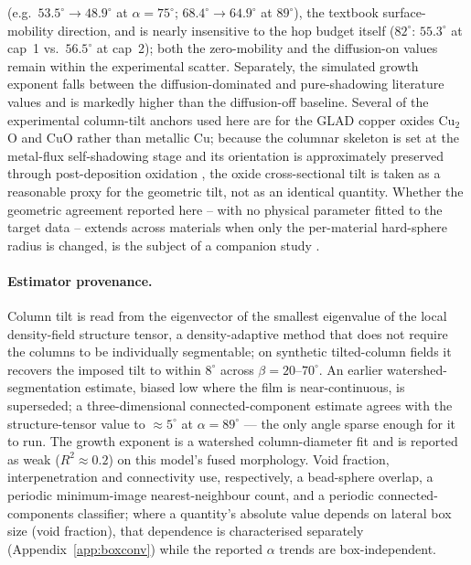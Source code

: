 \documentclass[aip,amsmath,amssymb,reprint]{revtex4-1}
\newcommand{\dang}{\ensuremath{\alpha}}
\begin{document}
(e.g.\ $53.5^{\circ}\!\to\!48.9^{\circ}$ at $\dang=75^{\circ}$;
$68.4^{\circ}\!\to\!64.9^{\circ}$ at $89^{\circ}$), the textbook
surface-mobility direction, and is nearly insensitive to the hop budget
itself ($82^{\circ}$: $55.3^{\circ}$ at cap~1 vs.\ $56.5^{\circ}$ at
cap~2); both the zero-mobility and the diffusion-on values remain within
the experimental scatter. Separately, the simulated growth exponent falls
between the diffusion-dominated and pure-shadowing literature values
\citep{karabacak2003} and is markedly higher than the diffusion-off
baseline.
Several of the experimental column-tilt anchors used here are for the GLAD
copper oxides Cu$_2$O and CuO rather than metallic Cu; because the columnar
skeleton is set at the metal-flux self-shadowing stage and its orientation
is approximately preserved through post-deposition oxidation
\citep{mock2016coreshell}, the oxide cross-sectional tilt is taken as a
reasonable proxy for the geometric tilt, not as an identical quantity.
Whether the geometric agreement reported here -- with no physical parameter
fitted to the target data -- extends across materials when only the
per-material hard-sphere radius is changed, is the subject of a companion
study \citep{companionP3}.
\paragraph{Estimator provenance.}
Column tilt is read from the eigenvector of the smallest eigenvalue of the
local density-field structure tensor, a density-adaptive method that does
not require the columns to be individually segmentable; on synthetic
tilted-column fields it recovers the imposed tilt to within $8^{\circ}$
across $\beta=20$--$70^{\circ}$. An earlier watershed-segmentation estimate,
biased low where the film is near-continuous, is superseded; a
three-dimensional connected-component estimate agrees with the
structure-tensor value to $\approx5^{\circ}$ at $\dang=89^{\circ}$ --- the
only angle sparse enough for it to run. The growth exponent is a
watershed column-diameter fit and is reported as weak
($R^{2}\approx0.2$) on this model's fused morphology. Void fraction,
interpenetration and connectivity use, respectively, a bead-sphere overlap,
a periodic minimum-image nearest-neighbour count, and a periodic
connected-components classifier; where a quantity's absolute value depends
on lateral box size (void fraction), that dependence is characterised
separately (Appendix~\ref{app:boxconv}) while the reported $\dang$ trends
are box-independent.
\end{document}
